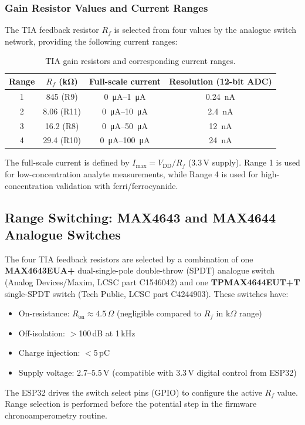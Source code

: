 \subsubsection{Gain Resistor Values and Current Ranges}

The TIA feedback resistor $R_f$ is selected from four values by the analogue switch network, providing the following current ranges:

\begin{table}[H]
\centering
\caption{TIA gain resistors and corresponding current ranges.}
\label{tab:tia_ranges}
\begin{tabular}{@{}cccc@{}}
\toprule
\textbf{Range} & $R_f$ (\si{\kilo\ohm}) & \textbf{Full-scale current} & \textbf{Resolution (12-bit ADC)} \\
\midrule
1 & 845 (R9)      & \SIrange{0}{1}{\micro\ampere}   & \SI{0.24}{\nano\ampere}  \\
2 & 8.06 (R11)    & \SIrange{0}{10}{\micro\ampere}  & \SI{2.4}{\nano\ampere}   \\
3 & 16.2 (R8)     & \SIrange{0}{50}{\micro\ampere}  & \SI{12}{\nano\ampere}    \\
4 & 29.4 (R10)    & \SIrange{0}{100}{\micro\ampere} & \SI{24}{\nano\ampere}    \\
\bottomrule
\end{tabular}
\end{table}

\noindent The full-scale current is defined by $I_\text{max} = V_\text{DD}/R_f$ (3.3\,V supply). Range 1 is used for low-concentration analyte measurements, while Range 4 is used for high-concentration validation with ferri/ferrocyanide.

\subsection{Range Switching: MAX4643 and MAX4644 Analogue Switches}
\label{subsec:switches}

The four TIA feedback resistors are selected by a combination of one \textbf{MAX4643EUA+} dual-single-pole double-throw (SPDT) analogue switch (Analog Devices/Maxim, LCSC part C1546042) and one \textbf{TPMAX4644EUT+T} single-SPDT switch (Tech Public, LCSC part C4244903). These switches have:
\begin{itemize}
    \item On-resistance: $R_\mathrm{on} \approx 4.5\,\Omega$ (negligible compared to $R_f$ in k$\Omega$ range)
    \item Off-isolation: $>$100\,dB at 1\,kHz
    \item Charge injection: $<$5\,pC
    \item Supply voltage: 2.7--5.5\,V (compatible with 3.3\,V digital control from ESP32)
\end{itemize}
The ESP32 drives the switch select pins (GPIO) to configure the active $R_f$ value. Range selection is performed before the potential step in the firmware chronoamperometry routine.


